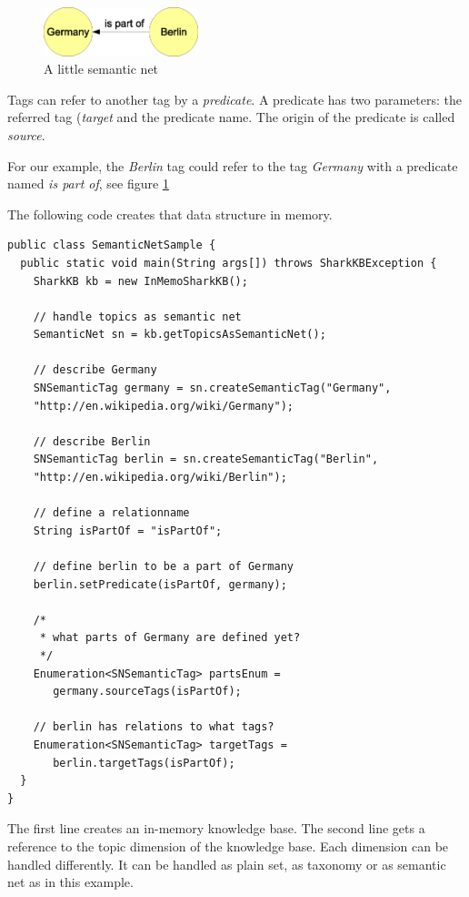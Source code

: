 \begin{figure}[t]
\centering
\includegraphics[width=0.40\textwidth]{semanticNet.eps}
\caption{A little semantic net}
\label{fig:semanticNet}
\end{figure}

Tags can refer to another tag by a {\it predicate}. A predicate has two parameters: the referred tag ({\it target} and the predicate name. The origin of the predicate is called {\it source}.

For our example, the {\it Berlin} tag could refer to the tag {\it Germany} with a predicate named {\it is part of}, see figure \ref{fig:semanticNet}

The following code creates that data structure in memory.

\begin{verbatim}
public class SemanticNetSample {
  public static void main(String args[]) throws SharkKBException {
    SharkKB kb = new InMemoSharkKB();

    // handle topics as semantic net
    SemanticNet sn = kb.getTopicsAsSemanticNet();

    // describe Germany
    SNSemanticTag germany = sn.createSemanticTag("Germany",
    "http://en.wikipedia.org/wiki/Germany");

    // describe Berlin
    SNSemanticTag berlin = sn.createSemanticTag("Berlin",
    "http://en.wikipedia.org/wiki/Berlin");

    // define a relationname
    String isPartOf = "isPartOf";

    // define berlin to be a part of Germany
    berlin.setPredicate(isPartOf, germany);

    /*
     * what parts of Germany are defined yet?
     */
    Enumeration<SNSemanticTag> partsEnum =
       germany.sourceTags(isPartOf);

    // berlin has relations to what tags?
    Enumeration<SNSemanticTag> targetTags =
       berlin.targetTags(isPartOf);
  }
}

\end{verbatim}

The first line creates an in-memory knowledge base. The second line
gets a reference to the topic dimension of the knowledge base. Each dimension can be handled differently. It can be handled as plain set, as taxonomy or as semantic net as in this example.

